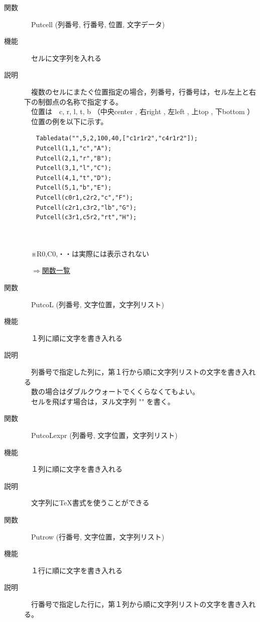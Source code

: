 \documentclass[papersize,a4paper,12pt,uplatex]{jsarticle}
\begin{document}
\begin{description}
\hypertarget{putcell}{}
\item[関数]　Putcell (列番号, 行番号, 位置, 文字データ)
\item[機能]　セルに文字列を入れる
\item[説明]　複数のセルにまたぐ位置指定の場合，列番号，行番号は，セル左上と右下の制御点の名称で指定する。\\
　位置は　c, r, l, t, b （中央center , 右right , 左left , 上top , 下bottom   ）\\
　位置の例を以下に示す。
\begin{verbatim}
　　Tabledata("",5,2,100,40,["c1r1r2","c4r1r2"]);
　　Putcell(1,1,"c","A");
　　Putcell(2,1,"r","B");
　　Putcell(3,1,"l","C");
　　Putcell(4,1,"t","D");
　　Putcell(5,1,"b","E");
　　Putcell(c0r1,c2r2,"c","F");
　　Putcell(c2r1,c3r2,"lb","G");
　　Putcell(c3r1,c5r2,"rt","H");
\end{verbatim}
　\\
　　　\\
　※R0,C0,・・は実際には表示されない\\

\begin{flushright}　\hyperlink{functionlist}{$\Rightarrow$関数一覧}\end{flushright}

\hypertarget{putcol}{}
\item[関数]　PutcoL (列番号, 文字位置，文字列リスト)
\item[機能]　１列に順に文字を書き入れる
\item[説明]　列番号で指定した列に，第１行から順に文字列リストの文字を書き入れる\\
　数の場合はダブルクウォートでくくらなくてもよい。\\
　セルを飛ばす場合は，ヌル文字列 "" を書く。\\


\hypertarget{putcolexpr}{}
\item[関数]　PutcoLexpr (列番号, 文字位置，文字列リスト)
\item[機能]　１列に順に文字を書き入れる
\item[説明]　文字列に\TeX 書式を使うことができる\\

\hypertarget{putrow}{}
\item[関数]　Putrow (行番号, 文字位置，文字列リスト)
\item[機能]　１行に順に文字を書き入れる
\item[説明]　行番号で指定した行に，第１列から順に文字列リストの文字を書き入れる。\\



\end{description}
\end{document}
